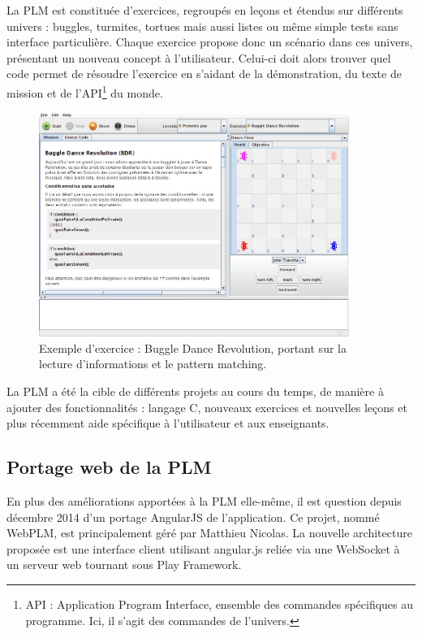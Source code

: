 \documentclass[stage]{tnreport}
\begin{document}
La PLM est constituée d'exercices, regroupés en leçons et étendus sur différents univers : buggles, turmites, tortues mais aussi listes ou même simple tests sans interface particulière. Chaque exercice propose donc un scénario dans ces univers, présentant un nouveau concept à l'utilisateur.
Celui-ci doit alors trouver quel code permet de résoudre l'exercice en s'aidant de la démonstration, du texte de mission et de l'API\footnote{API : Application Program Interface, ensemble des commandes spécifiques au programme. Ici, il s'agit des commandes de l'univers.} du monde.
\begin{figure}[h]
	\centering
		\includegraphics[width=0.9\textwidth]{figures/PLM-exercice1}
	\caption{Exemple d'exercice : Buggle Dance Revolution, portant sur la lecture d'informations et le pattern matching.}
	\label{fig:plmEx1}
\end{figure}

La PLM a été la cible de différents projets au cours du temps, de manière à ajouter des fonctionnalités : langage C, nouveaux exercices et nouvelles leçons et plus récemment aide spécifique à l'utilisateur et aux enseignants.

\subsection{Portage web de la PLM}

En plus des améliorations apportées à la PLM elle-même, il est question depuis décembre 2014 d'un portage AngularJS de l'application. Ce projet, nommé WebPLM, est principalement géré par Matthieu Nicolas.
La nouvelle architecture proposée est une interface client utilisant angular.js reliée via une WebSocket à un serveur web tournant sous Play Framework.
\end{document}
